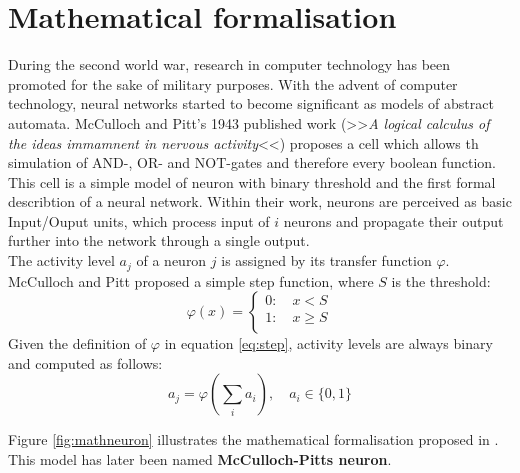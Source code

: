 \documentclass[10pt,a4paper,DIV=11]{scrreprt}
\begin{document}
\section{Mathematical formalisation}\label{sec:mcpitts}
During the second world war, research in computer technology has been promoted for the sake of military purposes. With the advent of computer technology, neural networks started to become significant as models of abstract automata. McCulloch and Pitt's 1943 published work (>>\textit{A logical calculus of the ideas immamnent in nervous activity}<<) proposes a cell which allows th simulation of AND-, OR- and NOT-gates and therefore every boolean function. This cell is a simple model of neuron with binary threshold and the first formal describtion of a neural network. Within their work, neurons are perceived as basic Input/Ouput units, which process input of $i$ neurons and propagate their output further into the network through a single output.\\

The activity level $a_j$ of a neuron $j$ is assigned by its transfer function $\varphi$. McCulloch and Pitt proposed a simple step function, where $S$ is the threshold:\\

\begin{equation}
	\varphi(x)=\begin{cases}
		0: \quad  x < S \\
		1: \quad  x \geq S \\
	\end{cases}
\label{eq:step}
\end{equation}
Given the definition of $\varphi$ in equation \eqref{eq:step}, activity levels are always binary and computed as follows:\\


\begin{equation}
a_j = \varphi(\sum_{i}^{} a_{i}), \quad a_i \in \{0, 1\}
\end{equation}

Figure \ref{fig:mathneuron} illustrates the mathematical formalisation proposed in \cite{NEURONMATH}. This model has later been named \textbf{McCulloch-Pitts neuron}. 
\end{document}
